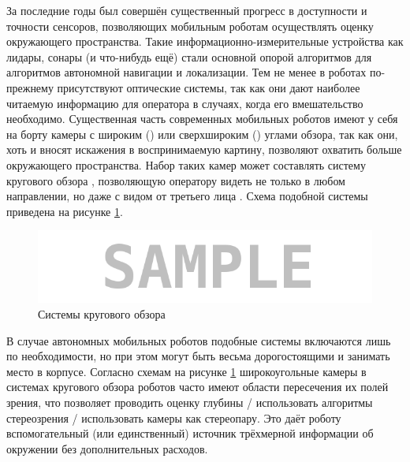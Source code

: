
За последние годы был совершён существенный прогресс в доступности и точности сенсоров, позволяющих мобильным роботам 
осуществлять оценку окружающего пространства. Такие информационно-измерительные устройства как лидары, сонары (и что-нибудь 
ещё) стали основной опорой алгоритмов для алгоритмов автономной навигации и локализации. Тем не менее в роботах по-прежнему 
присутствуют оптические системы, так как они дают наиболее читаемую информацию для оператора в случаях, когда его вмешательство 
необходимо. Существенная часть современных мобильных роботов имеют у себя на борту камеры с широким () или сверхшироким ()          %
углами обзора, так как они, хоть и вносят искажения в воспринимаемую картину, позволяют охватить больше окружающего пространства. %
Набор таких камер может составлять систему кругового обзора \cite{}, позволяющую оператору видеть не только в любом направлении, 
но даже с видом от третьего лица \cite{}. Схема подобной системы приведена на рисунке \ref{pic:examples}. 

\begin{figure}[H]
    \begin{center}
        \includegraphics[scale=0.5]{pics/sample.png}
        \caption{Системы кругового обзора}
        \label{pic:examples}
    \end{center}
\end{figure}
    
В случае автономных мобильных роботов подобные системы включаются лишь по необходимости, но при этом могут быть весьма 
дорогостоящими и занимать место в корпусе. %
Согласно схемам на рисунке \ref{pic:examples} широкоугольные камеры в системах кругового обзора роботов часто имеют области %
пересечения их полей зрения, что позволяет проводить оценку глубины / использовать алгоритмы стереозрения / использовать камеры как стереопару. %
Это даёт роботу вспомогательный (или единственный) источник трёхмерной информации об окружении без дополнительных расходов. %

